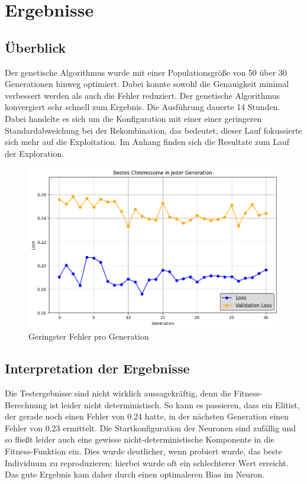 \chapter{Ergebnisse}
\section{Überblick}
Der genetische Algorithmus wurde mit einer Populationsgröße von 50 über 30 Generationen hinweg optimiert. Dabei konnte sowohl die Genauigkeit minimal verbessert werden als auch die Fehler reduziert. Der genetische Algorithmus konvergiert sehr schnell zum Ergebnis. Die Ausführung dauerte 14 Stunden. Dabei handelte es sich um die Konfiguration mit einer einer geringeren Standardabweichung bei der Rekombination, das bedeutet, dieser Lauf fokussierte sich mehr auf die Exploitation. Im Anhang finden sich die Resultate zum Lauf der Exploration.

\begin{figure}[h]
	\centering
	\includegraphics[width=1\linewidth]{loss.png}
	\caption{Geringster Fehler pro Generation}
	\label{fig:enter-label}
\end{figure}


\section{Interpretation der Ergebnisse}
Die Testergebnisse sind nicht wirklich aussagekräftig, denn die Fitness-Berechnung ist leider nicht deterministisch. So kann es passieren, dass ein Elitist, der gerade noch einen Fehler von 0.24 hatte, in der nächsten Generation einen Fehler von 0.23 ermittelt. Die Startkonfiguration der Neuronen sind zufällig und so fließt leider auch eine gewisse nicht-deterministische Komponente in die Fitness-Funktion ein. Dies wurde deutlicher, wenn probiert wurde, das beste Individuum zu reproduzieren: hierbei wurde oft ein schlechterer Wert erreicht. Das gute Ergebnis kam daher durch einen optimaleren Bias im Neuron.

